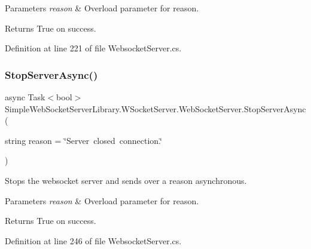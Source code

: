 \begin{DoxyParams}{Parameters}
{\em reason} & Overload parameter for reason. \\
\hline
\end{DoxyParams}
\begin{DoxyReturn}{Returns}
True on success.
\end{DoxyReturn}


Definition at line 221 of file Websocket\+Server.\+cs.

\mbox{\label{class_simple_web_socket_server_library_1_1_w_socket_server_1_1_web_socket_server_a8fc32773b77146e5380e4d932b5b3511}} 
\subsubsection{\texorpdfstring{Stop\+Server\+Async()}{StopServerAsync()}}
{\footnotesize\ttfamily async Task$<$bool$>$ Simple\+Web\+Socket\+Server\+Library.\+W\+Socket\+Server.\+Web\+Socket\+Server.\+Stop\+Server\+Async (\begin{DoxyParamCaption}\item[{string}]{reason = {\ttfamily \char`\"{}Server~closed~connection.\char`\"{}} }\end{DoxyParamCaption})}



Stops the websocket server and sends over a reason asynchronous. 


\begin{DoxyParams}{Parameters}
{\em reason} & Overload parameter for reason. \\
\hline
\end{DoxyParams}
\begin{DoxyReturn}{Returns}
True on success.
\end{DoxyReturn}


Definition at line 246 of file Websocket\+Server.\+cs.



